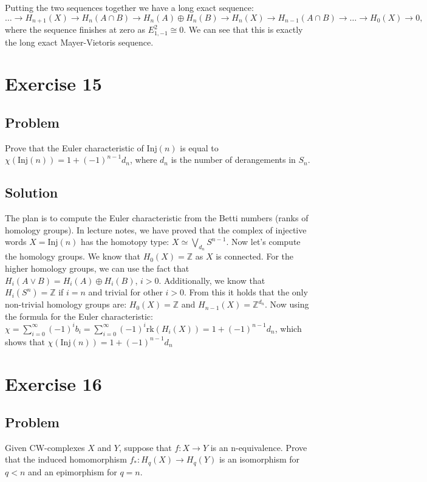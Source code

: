 \documentclass{article}
\begin{document}
\noindent
Putting the two sequences together we have a long exact sequence:
\begin{equation*}
\dots \to H_{n+1}(X) \to H_{n}(A \cap B) \to H_{n}(A) \oplus H_{n}(B) \to H_n(X) \to H_{n-1}(A \cap B) \to \dots \to H_0(X) \to 0,
\end{equation*}
where the sequence finishes at zero as $E^2_{1,-1} \cong 0$. We can see that this is exactly the long exact Mayer-Vietoris sequence.

\newpage
\section*{Exercise 15}
\subsection*{Problem}
Prove that the Euler characteristic of $\mathrm{Inj}(n)$ is equal to
$\chi(\mathrm{Inj}(n)) = 1 + (-1)^{n-1} d_n$,
where $d_n$ is the number of derangements in $S_n$.
\subsection*{Solution}
The plan is to compute the Euler characteristic from the Betti numbers (ranks of homology groups).
In lecture notes, we have proved that the complex of injective words
$X = \mathrm{Inj}(n)$ has the homotopy type:
$X \simeq \bigvee_{d_n} S^{n-1}$.
Now let's compute the homology groups.
We know that $H_0(X) = \mathbb{Z}$ as $X$ is connected.
For the higher homology groups, we can use the fact that
$H_i (A \vee B) = H_i(A) \oplus H_i(B)$, $i>0$. Additionally, we know that $H_i (S^n) = \mathbb{Z}$ if $i=n$ and trivial for other $i>0$.
From this it holds that the only non-trivial homology groups are:
$H_0(X) = \mathbb{Z}$ and $H_{n-1}(X) = \mathbb{Z}^{d_n}$.
Now using the formula for the Euler characteristic:
$\chi = \sum_{i=0}^\infty (-1)^i b_i = \sum_{i=0}^\infty (-1)^i \mathrm{rk}(H_i(X)) = 1 + (-1)^{n-1} d_n$,
which shows that $\chi(\mathrm{Inj}(n)) = 1+(-1)^{n-1} d_n$
\newpage
\section*{Exercise 16}
\subsection*{Problem}
Given CW-complexes $X$ and $Y$, suppose that $f: X \to Y$ is an
n-equivalence. Prove that the induced homomorphism $f_*: H_q(X) \to H_q(Y)$ is an isomorphism for $q < n$ and an epimorphism for $q=n$.
\end{document}
